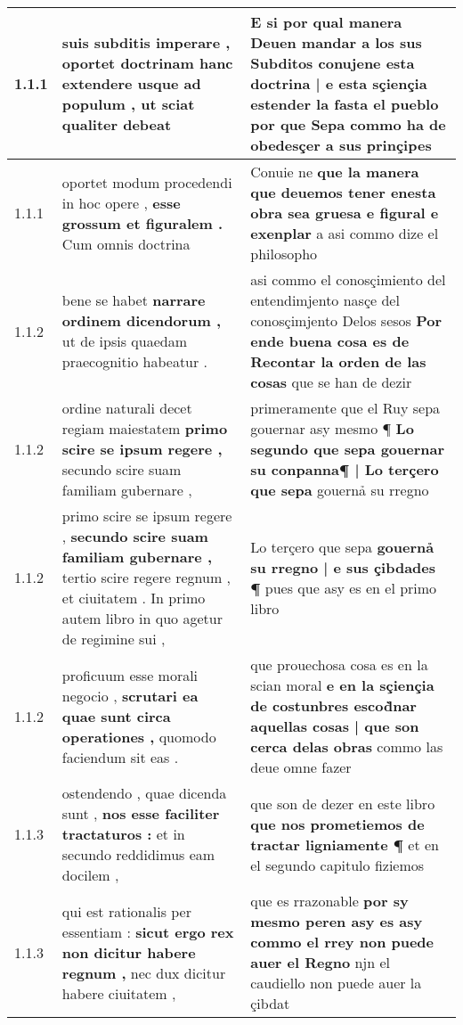 \begin{tabular}{|p{1cm}|p{6.5cm}|p{6.5cm}|}

\hline
1.1.1 & suis subditis imperare , \textbf{ oportet doctrinam hanc extendere usque ad populum , } ut sciat qualiter debeat & E si por qual manera Deuen mandar a los sus Subditos \textbf{ conujene esta doctrina | e esta sçiençia estender la fasta el pueblo } por que Sepa commo ha de obedesçer a sus prinçipes \\\hline
1.1.1 & oportet modum procedendi in hoc opere , \textbf{ esse grossum et figuralem . } Cum omnis doctrina & Conuie ne \textbf{ que la manera que deuemos tener enesta obra sea gruesa e figural e exenplar } a asi commo dize el philosopho \\\hline
1.1.2 & bene se habet \textbf{ narrare ordinem dicendorum , } ut de ipsis quaedam praecognitio habeatur . & asi commo el conosçimiento del entendimjento nasçe del conosçimjento Delos sesos \textbf{ Por ende buena cosa es de Recontar la orden de las cosas } que se han de dezir \\\hline
1.1.2 & ordine naturali decet regiam maiestatem \textbf{ primo scire se ipsum regere , } secundo scire suam familiam gubernare , & primeramente que el Ruy sepa gouernar asy mesmo ¶ \textbf{ Lo segundo que sepa gouernar su conpanna¶ | Lo terçero que sepa } gouernả su rregno \\\hline
1.1.2 & primo scire se ipsum regere , \textbf{ secundo scire suam familiam gubernare , } tertio scire regere regnum , et ciuitatem . In primo autem libro in quo agetur de regimine sui , & Lo terçero que sepa \textbf{ gouernả su rregno | e sus çibdades ¶ } pues que asy es en el primo libro \\\hline
1.1.2 & proficuum esse morali negocio , \textbf{ scrutari ea quae sunt circa operationes , } quomodo faciendum sit eas . & que prouechosa cosa es en la scian moral \textbf{ e en la sçiençia de costunbres escod̀nar aquellas cosas | que son cerca delas obras } commo las deue omne fazer \\\hline
1.1.3 & ostendendo , quae dicenda sunt , \textbf{ nos esse faciliter tractaturos : } et in secundo reddidimus eam docilem , & que son de dezer en este libro \textbf{ que nos prometiemos de tractar ligniamente ¶ } et en el segundo capitulo fiziemos \\\hline
1.1.3 & qui est rationalis per essentiam : \textbf{ sicut ergo rex non dicitur habere regnum , } nec dux dicitur habere ciuitatem , & que es rrazonable \textbf{ por sy mesmo peren asy es asy commo el rrey non puede auer el Regno } njn el caudiello non puede auer la çibdat \\\hline

\end{tabular}
